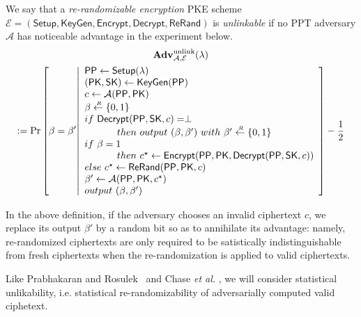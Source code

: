 \documentclass[10pt]{llncs}
\newcommand{\Adv}{\mathbf{Adv}}
\newcommand{\A}{\mathcal{A}}
\newcommand{\SK}{\mathsf{SK}}
\newcommand{\PK}{\mathsf{PK}}
\newcommand{\sample}{\stackrel{{\scriptscriptstyle \mkern4mu R}}{\gets}}
\newcommand{\Setup}{{\mathsf{Setup}}}
\newcommand{\KeyGen}{{\mathsf{KeyGen}}}
\newcommand{\Enc}{{\mathsf{Encrypt}}}
\newcommand{\Dec}{{\mathsf{Decrypt}}}
\newcommand{\Rerand}{{\mathsf{ReRand}}}
\newcommand{\PPP}{\mathsf{PP}}
\begin{document}
  \begin{definition}\label{def:unlikability} We say that a \emph{re-randomizable encryption} PKE scheme $\mathcal{E} = (\Setup, \KeyGen, \Enc, \Dec, \Rerand)$ is \emph{unlinkable} if no PPT adversary $\A$ has noticeable  advantage in the experiment below.
    \begin{multline*}
      \Adv_{\A, \mathcal{E}}^{\mathrm{unlink}} (\lambda) \\ := \Pr \left[
      \beta = \beta '
      \middle|
      \begin{array}{l}
        \PPP \gets \Setup(\lambda)\\
        (\PK, \SK) \gets \KeyGen(\PPP)\\
        c \gets \A (\PPP, \PK)\\
				\beta \sample \{0,1\}\\
				if 	~	\Dec(\PPP, \SK, c)=\perp\\ 
				\qquad \quad ~then~output~(\beta,\beta')~with~\beta' \sample \{0,1\} \\
        if~ \beta = 1\\ \qquad \quad ~ then~ c^\star \leftarrow \Enc(\PPP, \PK, \Dec(\PPP, \SK, c))\\
        else~c^\star \leftarrow \Rerand(\PPP,\PK, c )\\
        \beta' \gets \A (\PPP, \PK, c^\star) \\
				output~(\beta,\beta')
      \end{array}
      \right] - \frac{1}{2}
    \end{multline*}
  \end{definition}
  
In the above definition, if the adversary chooses an invalid ciphertext $c$, we replace its output $\beta'$ by a random bit so as to annihilate 
its advantage: namely, re-randomized ciphertexts are only required to be satistically indistinguishable from fresh ciphertexts when the 
re-randomization is applied to  valid ciphertexts.

Like  Prabhakaran and Rosulek~\cite{DBLP:conf/crypto/PrabhakaranR07} and   Chase {\it et al.} \cite{DBLP:conf/eurocrypt/ChaseKLM12}, 
we will consider statistical unlikability, i.e. statistical re-randomizability
of adversarially computed valid ciphetext. 
\end{document}
